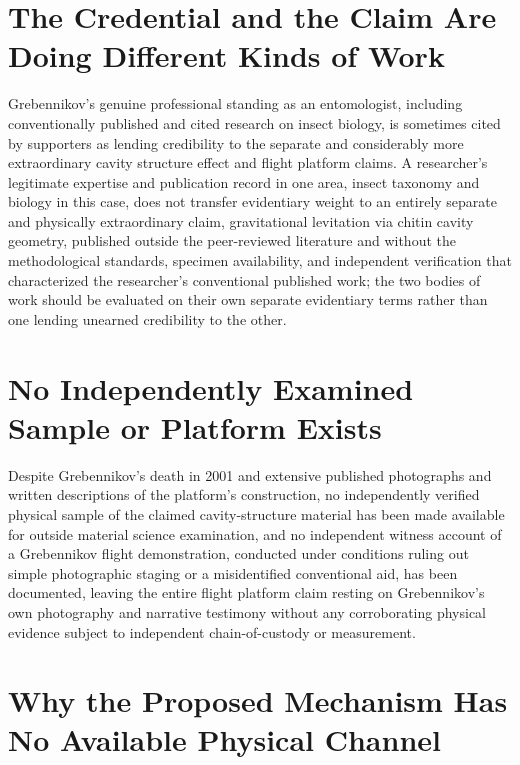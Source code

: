 \documentclass[11pt]{article}
\begin{document}
\section{The Credential and the Claim Are Doing Different Kinds of Work}

Grebennikov's genuine professional standing as an entomologist, including conventionally published and cited research on insect biology, is sometimes cited by supporters as lending credibility to the separate and considerably more extraordinary cavity structure effect and flight platform claims. A researcher's legitimate expertise and publication record in one area, insect taxonomy and biology in this case, does not transfer evidentiary weight to an entirely separate and physically extraordinary claim, gravitational levitation via chitin cavity geometry, published outside the peer-reviewed literature and without the methodological standards, specimen availability, and independent verification that characterized the researcher's conventional published work; the two bodies of work should be evaluated on their own separate evidentiary terms rather than one lending unearned credibility to the other.

\section{No Independently Examined Sample or Platform Exists}

Despite Grebennikov's death in 2001 and extensive published photographs and written descriptions of the platform's construction, no independently verified physical sample of the claimed cavity-structure material has been made available for outside material science examination, and no independent witness account of a Grebennikov flight demonstration, conducted under conditions ruling out simple photographic staging or a misidentified conventional aid, has been documented, leaving the entire flight platform claim resting on Grebennikov's own photography and narrative testimony without any corroborating physical evidence subject to independent chain-of-custody or measurement.

\section{Why the Proposed Mechanism Has No Available Physical Channel}
\end{document}
